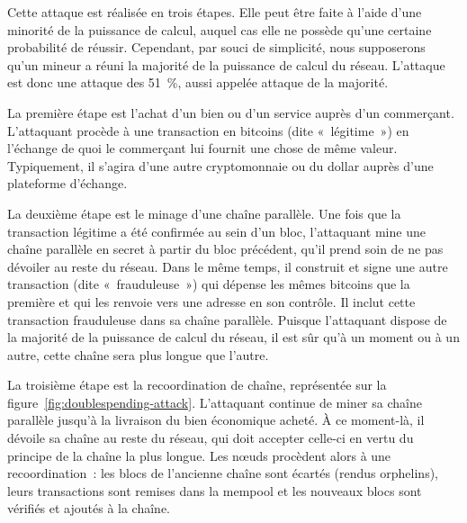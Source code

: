 
Cette attaque est réalisée en trois étapes. Elle peut être faite à l'aide d'une minorité de la puissance de calcul, auquel cas elle ne possède qu'une certaine probabilité de réussir. Cependant, par souci de simplicité, nous supposerons qu'un mineur a réuni la majorité de la puissance de calcul du réseau. L'attaque est donc une attaque des 51~\%, aussi appelée attaque de la majorité.

La première étape est l'achat d'un bien ou d'un service auprès d'un commerçant. L'attaquant procède à une transaction en bitcoins (dite «~légitime~») en l'échange de quoi le commerçant lui fournit une chose de même valeur. Typiquement, il s'agira d'une autre cryptomonnaie ou du dollar auprès d'une plateforme d'échange.

La deuxième étape est le minage d'une chaîne parallèle. Une fois que la transaction légitime a été confirmée au sein d'un bloc, l'attaquant mine une chaîne parallèle en secret à partir du bloc précédent, qu'il prend soin de ne pas dévoiler au reste du réseau. Dans le même temps, il construit et signe une autre transaction (dite «~frauduleuse~») qui dépense les mêmes bitcoins que la première et qui les renvoie vers une adresse en son contrôle. Il inclut cette transaction frauduleuse dans sa chaîne parallèle. Puisque l'attaquant dispose de la majorité de la puissance de calcul du réseau, il est sûr qu'à un moment ou à un autre, cette chaîne sera plus longue que l'autre.

La troisième étape est la recoordination de chaîne, représentée sur la figure~\ref{fig:doublespending-attack}. L'attaquant continue de miner sa chaîne parallèle jusqu'à la livraison du bien économique acheté. À ce moment-là, il dévoile sa chaîne au reste du réseau, qui doit accepter celle-ci en vertu du principe de la chaîne la plus longue. Les nœuds procèdent alors à une recoordination~: les blocs de l'ancienne chaîne sont écartés (rendus orphelins), leurs transactions sont remises dans la mempool et les nouveaux blocs sont vérifiés et ajoutés à la chaîne.

